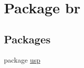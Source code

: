 \hypertarget{namespacebr}{\section{Package br}
\label{namespacebr}
}
\subsection*{Packages}
\begin{DoxyCompactItemize}
\item 
package \hyperlink{namespacebr_1_1usp}{usp}
\end{DoxyCompactItemize}
